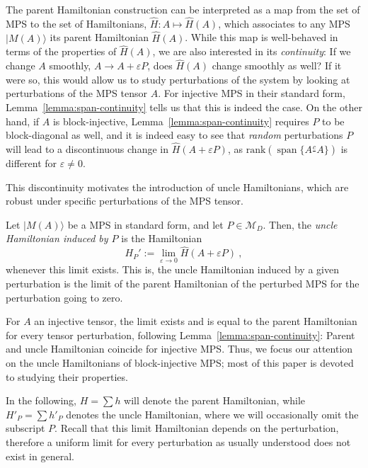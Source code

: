 \documentclass[cmp]{svjour}
\newcommand{\mc}[1]{\mathcal{#1}}
\newcommand{\veps}{\varepsilon}
\DeclareMathOperator{\spann}{span}
\newcommand{\ket}[1]{|#1\rangle}
\def\cont{\tfrac{c}{\ \ }}
\begin{document}
The parent Hamiltonian construction can be interpreted as a map from the
set of MPS to the set of Hamiltonians, $\hat H:A\mapsto \hat H(A)$, which
associates to any MPS $\ket{M(A)}$ its parent Hamiltonian $\hat H(A)$.
While this map is well-behaved in terms of the properties of $\hat
    H(A)$, we are also interested in its \emph{continuity}:  If we change $A$
smoothly, $A\rightarrow A+\veps P$, does $\hat H(A)$ change smoothly as
well?  If it were so, this would allow us to study perturbations of the
system by looking at perturbations of the MPS tensor $A$.  For injective
MPS in their standard form, Lemma~\ref{lemma:span-continuity} tells us
that this is indeed the case.  On the other hand, if $A$ is
block-injective, Lemma~\ref{lemma:span-continuity} requires $P$ to be
block-diagonal as well, and it is indeed easy to see that \emph{random}
perturbations $P$ will lead to a discontinuous change in $\hat H(A+\veps
    P)$, as $\mathrm{rank}(\spann\{A\cont A\})$ is different for $\veps\ne0$.

This discontinuity motivates the introduction of uncle Hamiltonians, which
are robust under specific perturbations of the MPS tensor.

\begin{definition}
    Let $\ket{M(A)}$ be a MPS in standard form, and let $P\in \mc M_D$. Then,
    the \emph{uncle Hamiltonian induced by $P$} is the Hamiltonian
    \begin{equation}
        \label{eq:parent-def}
        H_P' := \lim_{\varepsilon\rightarrow0} \hat H(A+\varepsilon P)\ ,
    \end{equation}
    whenever this limit exists.
    This is, the uncle Hamiltonian induced by a given perturbation is the limit of the parent Hamiltonian of
    the perturbed MPS for the perturbation going to zero.
\end{definition}
For $A$ an injective tensor, the limit exists and is equal to
the parent Hamiltonian for every tensor perturbation, following Lemma~\ref{lemma:span-continuity}:
Parent and uncle Hamiltonian coincide for injective MPS. Thus, we focus
our attention on the uncle Hamiltonians of block-injective MPS; most of
this paper is devoted to studying their properties.

In the following, $H=\sum h$ will denote the parent Hamiltonian, while
$H'_P=\sum h'_P$ denotes the uncle Hamiltonian, where we will occasionally
omit the subscript $P$. Recall that this limit Hamiltonian depends on the perturbation, therefore a uniform limit for every perturbation as usually understood does not exist in general.
\end{document}
